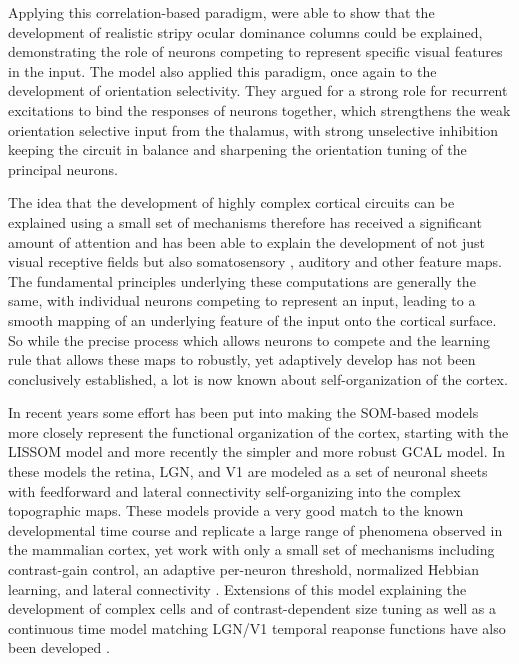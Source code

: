 Applying this correlation-based paradigm, \cite{Miller1989} were able
to show that the development of realistic stripy ocular dominance
columns could be explained, demonstrating the role of neurons
competing to represent specific visual features in the input. The
\cite{Somers1995} model also applied this paradigm, once again to the
development of orientation selectivity.  They argued for a strong role
for recurrent excitations to bind the responses of neurons together,
which strengthens the weak orientation selective input from the
thalamus, with strong unselective inhibition keeping the circuit in
balance and sharpening the orientation tuning of the principal
neurons.

The idea that the development of highly complex cortical circuits can
be explained using a small set of mechanisms therefore has received a
significant amount of attention and has been able to explain the
development of not just visual receptive fields but also somatosensory
\citep{Wilson2010}, auditory \cite{Khan2011} and other feature
maps. The fundamental principles underlying these computations are
generally the same, with individual neurons competing to represent an
input, leading to a smooth mapping of an underlying feature of the
input onto the cortical surface. So while the precise process which
allows neurons to compete and the learning rule that allows these maps
to robustly, yet adaptively develop has not been conclusively
established, a lot is now known about self-organization of the cortex.

In recent years some effort has been put into making the SOM-based
models more closely represent the functional organization of the
cortex, starting with the LISSOM model \citep{Bednar2003} and more
recently the simpler and more robust GCAL \citep{Stevens2013}
model. In these models the retina, LGN, and V1 are modeled as a set of
neuronal sheets with feedforward and lateral connectivity
self-organizing into the complex topographic maps. These models
provide a very good match to the known developmental time course and
replicate a large range of phenomena observed in the mammalian cortex,
yet work with only a small set of mechanisms including contrast-gain
control, an adaptive per-neuron threshold, normalized Hebbian
learning, and lateral connectivity 
\citep{Stevens2013}. Extensions of this model explaining the
development of complex cells and of contrast-dependent size tuning
\citep{Antolik2011} as well as a continuous time model matching LGN/V1
temporal reaponse functions have also been developed
\citep{Stevens2011}.

